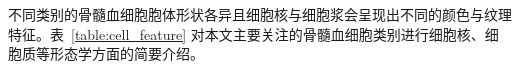 不同类别的骨髓血细胞胞体形状各异且细胞核与细胞浆会呈现出不同的颜色与纹理特征。表~\ref{table:cell_feature}
对本文主要关注的骨髓血细胞类别进行细胞核、细胞质等形态学方面的简要介绍。
